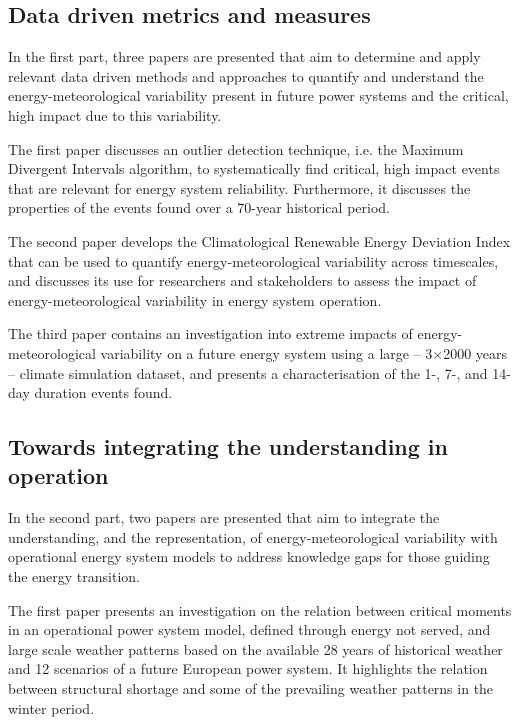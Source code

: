 \subsection*{Data driven metrics and measures}
In the first part, three papers are presented that aim to determine and apply relevant data driven methods and approaches to quantify and understand the energy-meteorological variability present in future power systems and the critical, high impact due to this variability.

The first paper discusses an outlier detection technique, i.e. the Maximum Divergent Intervals algorithm, to systematically find critical, high impact events that are relevant for energy system reliability.
Furthermore, it discusses the properties of the events found over a 70-year historical period.

The second paper develops the Climatological Renewable Energy Deviation Index that can be used to quantify energy-meteorological variability across timescales, and discusses its use for researchers and stakeholders to assess the impact of energy-meteorological variability in energy system operation.

The third paper contains an investigation into extreme impacts of energy-meteorological variability on a future energy system using a large -- 3$\times$2000 years -- climate simulation dataset, and presents a characterisation of the 1-, 7-, and 14-day duration events found.

\subsection*{Towards integrating the understanding in operation}
In the second part, two papers are presented that aim to integrate the understanding, and the representation, of energy-meteorological variability with operational energy system models to address knowledge gaps for those guiding the energy transition.

The first paper presents an investigation on the relation between critical moments in an operational power system model, defined through energy not served, and large scale weather patterns based on the available 28 years of historical weather and 12 scenarios of a future European power system.
It highlights the relation between structural shortage and some of the prevailing weather patterns in the winter period.

